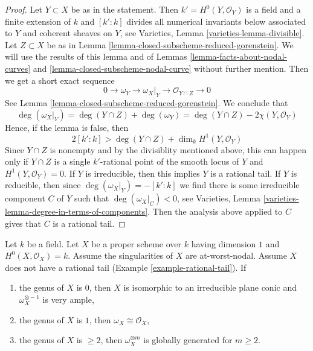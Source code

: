 \begin{proof}
Let $Y \subset X$ be as in the statement. Then $k' = H^0(Y, \mathcal{O}_Y)$
is a field and a finite extension of $k$ and $[k' : k]$
divides all numerical invariants below associated to $Y$ and
coherent sheaves on $Y$, see
Varieties, Lemma \ref{varieties-lemma-divisible}.
Let $Z \subset X$ be as in
Lemma \ref{lemma-closed-subscheme-reduced-gorenstein}.
We will use the results of this lemma and of
Lemmas \ref{lemma-facts-about-nodal-curves} and
\ref{lemma-closed-subscheme-nodal-curve} without further mention.
Then we get a short exact sequence
$$
0 \to \omega_Y \to \omega_X|_Y \to \mathcal{O}_{Y \cap Z} \to 0
$$
See Lemma \ref{lemma-closed-subscheme-reduced-gorenstein}.
We conclude that
$$
\deg(\omega_X|_Y) = \deg(Y \cap Z) + \deg(\omega_Y) =
\deg(Y \cap Z) - 2\chi(Y, \mathcal{O}_Y)
$$
Hence, if the lemma is false, then
$$
2[k' : k] > \deg(Y \cap Z) + \dim_k H^1(Y, \mathcal{O}_Y)
$$
Since $Y \cap Z$ is nonempty and by the divisiblity mentioned above,
this can happen only if $Y \cap Z$ is a single $k'$-rational point
of the smooth locus of $Y$ and $H^1(Y, \mathcal{O}_Y) = 0$.
If $Y$ is irreducible, then this implies $Y$ is a rational tail.
If $Y$ is reducible, then since $\deg(\omega_X|_Y) = -[k' : k]$
we find there is some irreducible component $C$ of $Y$
such that $\deg(\omega_X|_C) < 0$, see
Varieties, Lemma \ref{varieties-lemma-degree-in-terms-of-components}.
Then the analysis above applied
to $C$ gives that $C$ is a rational tail.
\end{proof}

\begin{lemma}
\label{lemma-no-rational-tail-semiample-genus-geq-2}
Let $k$ be a field. Let $X$ be a proper scheme over $k$ having dimension $1$
and $H^0(X, \mathcal{O}_X) = k$. Assume the singularities of $X$ are
at-worst-nodal. Assume $X$ does not have a rational tail
(Example \ref{example-rational-tail}). If
\begin{enumerate}
\item the genus of $X$ is $0$, then $X$ is isomorphic to an
irreducible plane conic and $\omega_X^{\otimes -1}$ is very ample,
\item the genus of $X$ is $1$, then $\omega_X \cong \mathcal{O}_X$,
\item the genus of $X$ is $\geq 2$, then
$\omega_X^{\otimes m}$ is globally generated for $m \geq 2$.
\end{enumerate}
\end{lemma}

